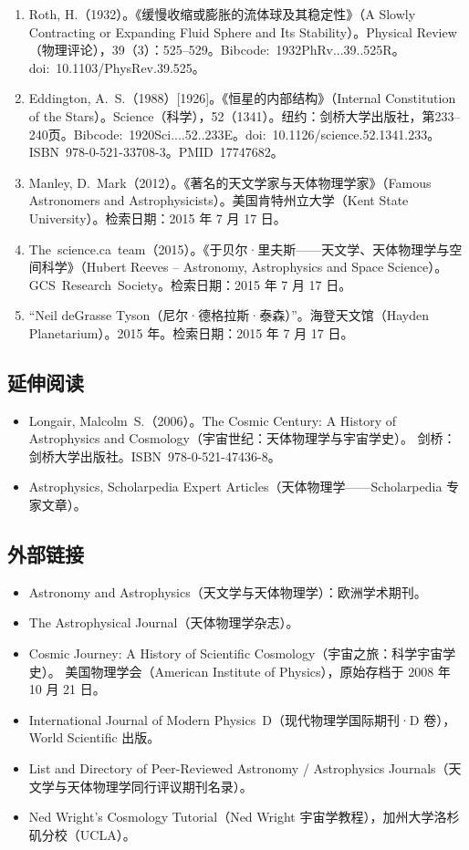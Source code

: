\begin{enumerate}
  \item Roth, H.（1932）。《缓慢收缩或膨胀的流体球及其稳定性》（A Slowly Contracting or Expanding Fluid Sphere and Its Stability）。Physical Review（物理评论），39（3）：525–529。Bibcode:~1932PhRv...39..525R。doi:~10.1103/PhysRev.39.525。
  \item Eddington, A.~S.（1988）[1926]。《恒星的内部结构》（Internal Constitution of the Stars）。Science（科学），52（1341）。纽约：剑桥大学出版社，第233–240页。Bibcode:~1920Sci....52..233E。doi:~10.1126/science.52.1341.233。ISBN~978-0-521-33708-3。PMID~17747682。
  \item Manley, D.~Mark（2012）。《著名的天文学家与天体物理学家》（Famous Astronomers and Astrophysicists）。美国肯特州立大学（Kent State University）。检索日期：2015 年 7 月 17 日。
  \item The~science.ca~team（2015）。《于贝尔·里夫斯——天文学、天体物理学与空间科学》（Hubert Reeves – Astronomy, Astrophysics and Space Science）。  
  GCS~Research~Society。检索日期：2015 年 7 月 17 日。
  \item “Neil deGrasse Tyson（尼尔·德格拉斯·泰森）”。海登天文馆（Hayden Planetarium）。2015 年。检索日期：2015 年 7 月 17 日。
\end{enumerate}
\subsection{延伸阅读}
\begin{itemize}
  \item Longair, Malcolm~S.（2006）。The Cosmic Century: A History of Astrophysics and Cosmology（宇宙世纪：天体物理学与宇宙学史）。  
  剑桥：剑桥大学出版社。ISBN~978-0-521-47436-8。
  \item Astrophysics, Scholarpedia Expert Articles（天体物理学——Scholarpedia 专家文章）。
\end{itemize}
\subsection{外部链接}
\begin{itemize}
  \item Astronomy and Astrophysics（天文学与天体物理学）：欧洲学术期刊。
  \item The Astrophysical Journal（天体物理学杂志）。
  \item Cosmic Journey: A History of Scientific Cosmology（宇宙之旅：科学宇宙学史）。  
  美国物理学会（American Institute of Physics），原始存档于 2008 年 10 月 21 日。
  \item International Journal of Modern Physics~D（现代物理学国际期刊·D 卷），World Scientific 出版。
  \item List and Directory of Peer-Reviewed Astronomy / Astrophysics Journals（天文学与天体物理学同行评议期刊名录）。
  \item Ned Wright’s Cosmology Tutorial（Ned Wright 宇宙学教程），加州大学洛杉矶分校（UCLA）。
\end{itemize}



